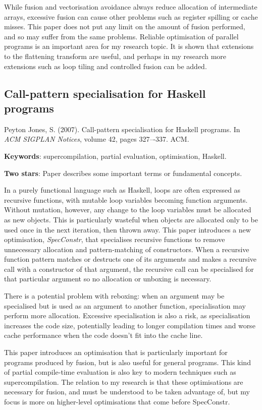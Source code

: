 \documentclass[12pt,a4paper]{article}
\begin{document}
While fusion and vectorisation avoidance always reduce allocation of intermediate arrays, excessive fusion can cause other problems such as register spilling or cache misses.
This paper does not put any limit on the amount of fusion performed, and so may suffer from the same problems.
Reliable optimisation of parallel programs is an important area for my research topic.
It is shown that extensions to the flattening transform are useful, and perhaps in my research more extensions such as loop tiling and controlled fusion can be added.

\subsection{Call-pattern specialisation for Haskell programs}
\cite{peyton2007call}
Peyton Jones, S. (2007). Call-pattern specialisation for Haskell programs. In \emph{ACM SIGPLAN Notices}, volume 42, pages 327–-337. ACM.

{\bf Keywords}: supercompilation, partial evaluation, optimisation, Haskell.

{\bf Two stars}: Paper describes some important terms or fundamental concepts.

In a purely functional language such as Haskell, loops are often expressed as recursive functions, with mutable loop variables becoming function arguments. 
Without mutation, however, any change to the loop variables must be allocated as new objects.
This is particularly wasteful when objects are allocated only to be used once in the next iteration, then thrown away.
This paper introduces a new optimisation, \emph{SpecConstr}, that 
specialises recursive functions to remove unnecessary allocation and pattern-matching of constructors.
When a recursive function pattern matches or destructs one of its arguments and makes a recursive call with a constructor of that argument,
the recursive call can be specialised for that particular argument so no allocation or unboxing is necessary.

There is a potential problem with reboxing: when an argument may be specialised but is used as an argument to another function, specialisation may perform more allocation.
Excessive specialisation is also a risk, as specialisation increases the code size, potentially leading to longer compilation times and worse cache performance when the code doesn't fit into the cache line.

This paper introduces an optimisation that is particularly important for programs produced by fusion,
but is also useful for general programs. This kind of partial compile-time evaluation is also key to modern techniques such as supercompilation.
The relation to my research is that these optimisations are necessary for fusion, and must be understood to be taken advantage of,
but my focus is more on higher-level optimisations that come before SpecConstr.
\end{document}
